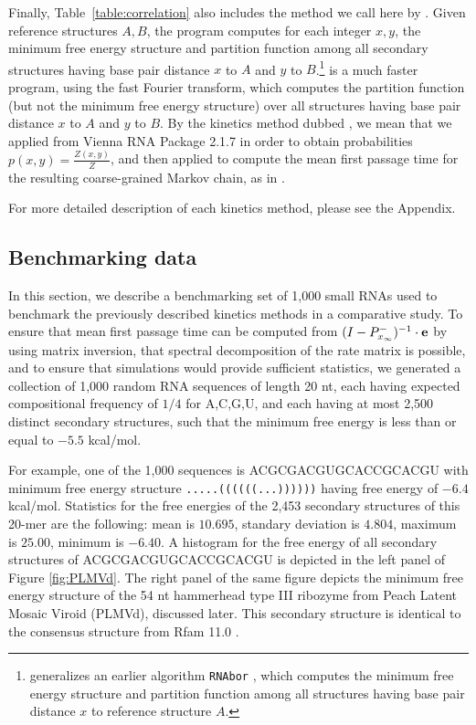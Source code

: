 Finally, Table~\ref{table:correlation}
also includes the method we call here by \rnatwofold.
Given reference structures $A,B$, the \rnatwofold  program
\cite{hofacker:RNAbor2D,Lorenz.amb11} computes for each integer
$x,y$, the minimum free energy structure and partition function
among all secondary structures having base pair distance $x$ to $A$
and $y$ to $B$.\footnote{\rnatwofold generalizes an earlier algorithm
{\tt RNAbor} \cite{Freyhult.b07,Freyhult.nar07}, which computes the
minimum free energy structure and partition function among all structures
having base pair distance $x$ to reference structure $A$.}
\ffttwo \cite{Senter.jmb14} is a much faster program, using the
fast Fourier transform, which
computes the partition function (but not the minimum free energy
structure) over all structures having base pair distance $x$ to $A$ and
$y$ to $B$. By the kinetics method dubbed
\rnatwofold, we mean that we applied
\rnatwofold from Vienna RNA Package 2.1.7
\cite{hofacker:RNAbor2D,Lorenz.amb11} in order
to obtain probabilities $p(x,y) = \frac{Z(x,y)}{Z}$,
and then applied \hermes to compute the mean first passage time for
the resulting coarse-grained Markov chain, as in \fftmfpt.

For more detailed description of each kinetics method, please see
the Appendix.

\subsection{Benchmarking data}

In this section, we describe a
benchmarking set of 1,000 small RNAs used to benchmark the previously
described kinetics methods in a comparative study. To ensure that mean
first passage time can be computed from
$(I - P^{-}_{x_{\infty}})^{-1} \cdot {\bf e}$ by using matrix
inversion, that spectral decomposition of the rate matrix is possible,
and to ensure that \kinfold simulations would provide sufficient
statistics, we generated a collection of 1,000 random RNA sequences of
length 20 nt, each having expected compositional frequency of $1/4$
for A,C,G,U, and each having at most 2,500 distinct secondary
structures, such that the minimum free energy is less than or equal to
$-5.5$ kcal/mol.

For example, one of the 1,000 sequences is ACGCGACGUGCACCGCACGU with
minimum free energy structure {\tt .....((((((...))))))} having free
energy of $-6.4$ kcal/mol. Statistics for the free energies of the
2,453 secondary structures of this 20-mer are the following: mean is
$10.695$, standary deviation is $4.804$, maximum is $25.00$, minimum
is $-6.40$. A histogram for the free energy of all secondary
structures of ACGCGACGUGCACCGCACGU is depicted in
the left panel of Figure \ref{fig:PLMVd}. The right panel of the
same figure depicts the minimum free energy structure of the
54 nt hammerhead type III ribozyme from Peach Latent Mosaic Viroid
(PLMVd), discussed later. This secondary structure is identical
to the consensus structure from Rfam 11.0 \cite{Gardner.nar11}.


